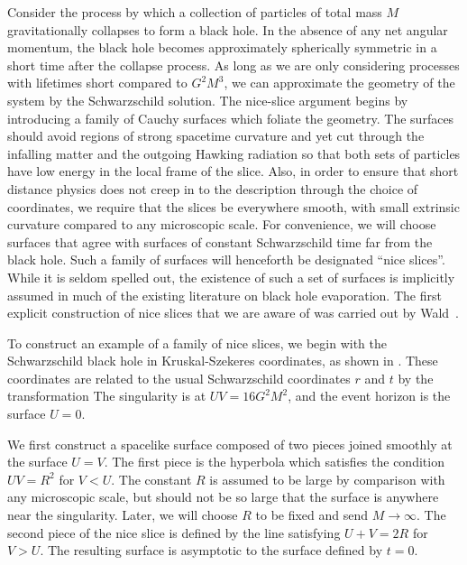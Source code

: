 
Consider the process by which a collection of particles of total mass
$M$ gravitationally collapses to form a black hole.   In the absence
of any net angular momentum, the black hole becomes approximately
spherically symmetric in a short time after the collapse process.
As long as we are only considering
processes with lifetimes short compared to $G^2 M^3$, we can
approximate the geometry of the system by the Schwarzschild solution.
 The nice-slice argument begins by introducing a family of Cauchy
surfaces which foliate the geometry.  The surfaces should
avoid regions of strong spacetime curvature and yet cut through
the infalling matter and the outgoing Hawking radiation so that both
sets of particles have low energy in the local frame of the slice.
Also, in order to ensure that short distance physics does not
creep in to the description through the choice of coordinates, we
require that the slices be everywhere smooth, with small extrinsic
curvature compared to any microscopic scale.  For convenience, we
will choose surfaces that agree with surfaces of constant
Schwarzschild time far from the black hole.  Such a family of
surfaces
will henceforth be designated ``nice slices''.  While it is seldom
spelled out, the existence of such a set of surfaces is implicitly
assumed in much of the existing literature on black hole evaporation.
The first explicit construction of nice slices that we are aware of
was carried out by Wald~.

\ifig{}
{\epsfxsize=5.5cm \epsfysize=5.5cm }

To construct an example of a family of nice slices, we begin with the
Schwarzschild
black hole in Kruskal-Szekeres coordinates, as shown in \fone.
These coordinates are related to the usual Schwarzschild coordinates
$r$ and $t$ by the transformation
\eqn{}
The singularity is at $UV = 16G^2 M^2$, and the event
horizon is the surface $U=0$.

We first construct a spacelike surface composed of two pieces joined
smoothly at the surface $U=V$.  The first piece is the hyperbola
which satisfies the condition $UV = R^2$ for $V < U$.  The constant
$R$ is assumed to be large by comparison with any microscopic scale,
but should not be so large that the surface is anywhere near the
singularity.  Later, we will choose $R$ to be fixed and send
$M \rightarrow \infty$.  The second piece of the nice slice is
defined by the line satisfying $U+V = 2R$ for $V > U$.   The
resulting surface is asymptotic to the surface defined by $t = 0$.
\ifig{}
{\epsfxsize=5.5cm \epsfysize=5.5cm }

